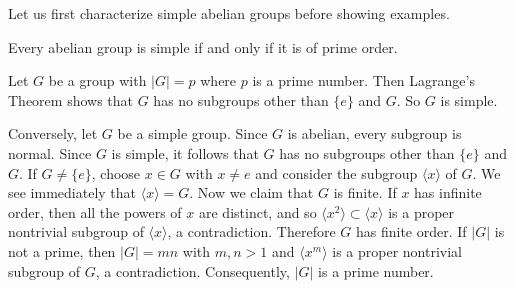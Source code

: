 Let us first characterize simple abelian groups before showing examples.
\begin{proposition} \label{prop-abelian-is-simple-iff-prime-order}
	Every abelian group is simple if and only if it is of prime order.
\end{proposition}
\begin{sketch}
	Let $G$ be a group with $|G| = p$ where $p$ is a prime number. Then Lagrange's Theorem shows that $G$ has no subgroups other than $\{e\}$ and $G$. So $G$ is simple.
	
	Conversely, let $G$ be a simple group. Since $G$ is abelian, every subgroup is normal. Since $G$ is simple,  it follows that $G$ has no subgroups other than $\{e\}$ and $G$. If $G \neq \{e\}$, choose $x \in G$ with $x \neq e$ and consider the subgroup $\langle x \rangle$ of $G$. We see immediately that $\langle x \rangle = G$. Now we claim that $G$ is finite. If $x$ has infinite order, then all the powers of $x$ are distinct, and so $\langle x^2 \rangle \subset \langle x \rangle$ is a proper  nontrivial subgroup of $\langle x \rangle$, a contradiction. Therefore $G$ has finite order. If $|G|$ is  not a prime, then $|G| = mn$ with $m,n>1$ and $\langle x^m \rangle$ is a proper nontrivial subgroup of $G$, a contradiction. Consequently, $|G|$ is a prime number.
\end{sketch}

